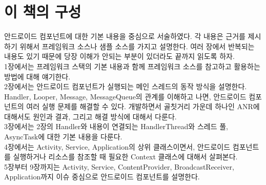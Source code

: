 \documentclass[a4paper,hidelinks,10pt,openany]{book} %
\begin{document}

\newpage

\begin{comment}
\begin{abstract}
잘 만든 앱은 다 그럭저럭이지만, 그렇지 않은 앱은 제각각의 이유가 있다. 여기서는 그럭저럭한 앱을 만드는 원리와 방법을 찾아보고, 문제를 발생시키는 제각각의 이유에 대해서도 얘기해보자.
\end{abstract}
\end{comment}

\chapter*{이 책의 구성}
안드로이드 컴포넌트에 대한 기본 내용을 중심으로 서술하였다. 각 내용은 근거를 제시하기 위해서 프레임워크 소스나 샘플 소스를 가지고 설명한다.
여러 장에서 반복되는 내용도 있기 때문에 당장 이해가 안되는 부분이 있더라도 끝까지 읽도록 하자.\\

1장에서는 프레임워크 스택의 기본 내용과 함께 프레임워크 소스를 참고하고 활용하는 방법에 대해 얘기한다.\\

2장에서는 안드로이드 컴포넌트가 실행되는 메인 스레드의 동작 방식을 설명한다.
Handler, Looper, Message, MessageQueue의 관계를 이해하고 나면, 안드로이드 컴포넌트의 여러 실행 문제를 해결할 수 있다. 
개발하면서 골칫거리 가운데 하나인 ANR에 대해서도 원인과 결과, 그리고 해결 방식에 대해서 다룬다.\\

3장에서는 2장의 Handler와 내용이 연결되는 HandlerThread와 스레드 풀, AsyncTask에 대한 기본 내용을 다룬다.\\

4장에서는 Activity, Service, Application의 상위 클래스이면서, 안드로이드 컴포넌트를 실행하거나 리소스를 참조할 때 필요한 Context 클래스에 대해서 살펴본다.\\

5장부터 9장까지는 Activity, Service, ContentProvider, BroadcastReceiver, Application까지 이슈 중심으로 안드로이드 컴포넌트를 설명한다.\\
\end{document}

